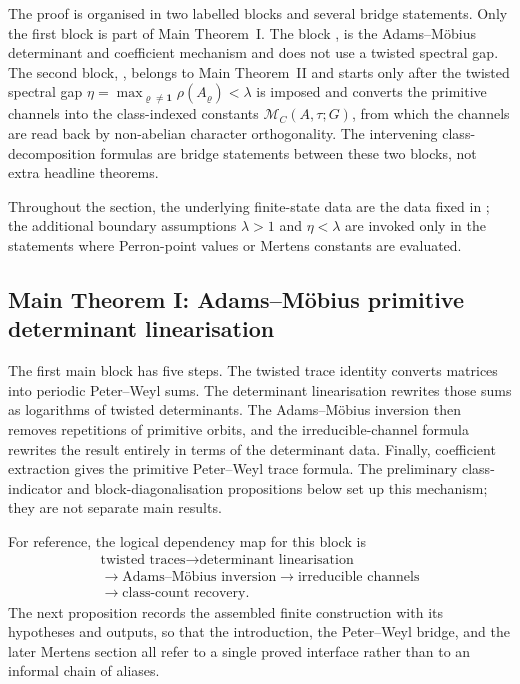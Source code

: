 \documentclass[11pt,a4paper]{amsart}
\theoremstyle{plain}
\theoremstyle{definition}
\theoremstyle{remark}
\begin{document}
The proof is organised in two labelled blocks and several bridge
statements.  Only the first block is part of Main Theorem~I. The block
,
is the Adams--M\"obius determinant and coefficient
mechanism and does not use a twisted spectral gap. The second block,
, belongs to Main Theorem~II and starts only
after the twisted spectral gap
\(\eta=\max_{\varrho\neq\mathbf 1}\rho(A_\varrho)<\lambda\) is imposed
and converts the primitive channels into the class-indexed constants
\(\mathcal M_C(A,\tau;G)\), from which the channels are read back by
non-abelian character orthogonality. The
intervening class-decomposition formulas are bridge statements between
these two blocks, not extra headline theorems.

Throughout the section, the underlying finite-state data are the data
fixed in ; the additional boundary
assumptions \(\lambda>1\) and \(\eta<\lambda\) are invoked only in the
statements where Perron-point values or Mertens constants are evaluated.

\subsection{Main Theorem I: Adams--M\"obius primitive determinant
linearisation}

The first main block has five steps. The twisted trace identity converts
matrices into periodic Peter--Weyl sums. The determinant linearisation
rewrites those sums as logarithms of twisted determinants. The
Adams--M\"obius inversion then removes repetitions of primitive orbits,
and the irreducible-channel formula rewrites the result entirely in
terms of the determinant data. Finally, coefficient extraction gives the
primitive Peter--Weyl trace formula. The preliminary class-indicator and
block-diagonalisation propositions below set up this mechanism; they
are not separate main results.

For reference, the logical dependency map for this block is
\[
\begin{array}{c}
  \text{twisted traces}\to\text{determinant linearisation}\\[2pt]
  \to\text{Adams--M\"obius inversion}\to\text{irreducible channels}\\[2pt]
  \to\text{class-count recovery}.
\end{array}
\]
The next proposition records the assembled finite construction with its
hypotheses and outputs, so that the introduction, the Peter--Weyl bridge, and
the later Mertens section all refer to a single proved interface rather than to
an informal chain of aliases.
\end{document}
